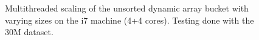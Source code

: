 \begin{landscape}
\begin{figure}[!h]
{        }
        \label{fig:ts_i7_30m_unsorted}
        \caption{Multithreaded scaling of the unsorted dynamic array bucket with varying sizes on the
        i7 machine (4+4 cores). Testing done with the 30M dataset.}
    \end{figure}
    \begin{figure}[!h]
\end{figure}
\end{landscape}
